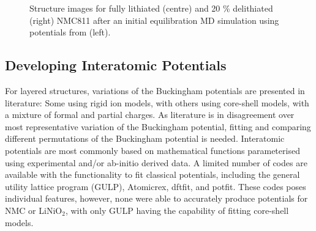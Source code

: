 \documentclass[aps,prb,twocolumn,superscriptaddress,reprint]{revtex4-1}
\begin{document}
\begin{figure}[h]
  \centering
    \caption{\label{fig:structure_collapse} Structure images for fully lithiated (centre) and 20 \% delithiated (right) NMC811 after an initial equilibration MD simulation using potentials from \citeauthor{Lee_and_Park_2012} (left). \cite{Lee_and_Park_2012} }
\end{figure}

\subsection{Developing Interatomic Potentials}
For layered structures, variations of the Buckingham potentials are presented in literature: Some using rigid ion models,\cite{Lewis_1985, Ledwaba2020, Sayle2005, Dawson2014} with others using core-shell models, \cite{Hart1998, Fisher2010, Lewis_1985,Ammundsen1999, Kerisit2014, He2019,lee2012atomistic} with a mixture of formal and partial charges. As literature is in disagreement over most representative variation of the Buckingham potential, fitting and comparing different permutations of the Buckingham potential is needed. Interatomic potentials are most commonly based on mathematical functions parameterised using experimental and/or ab-initio derived data. \cite{jones_1924, buckingham_classical_1938} A limited number of codes are available with the functionality to fit classical potentials, including the general utility lattice program (GULP), \cite{gale_gulp_1997} Atomicrex, \cite{Stukowski_2017} dftfit, \cite{dftfit} and potfit. \cite{wen_kim-compliant_2017} These codes poses individual features, however, none were able to accurately produce potentials for NMC or LiNiO$_2$, with only GULP having the capability of fitting core-shell models.
\end{document}
